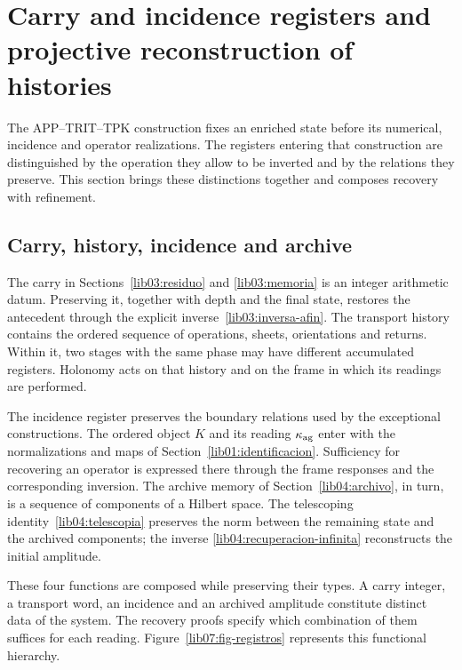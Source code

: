 \section{Carry and incidence registers and projective reconstruction of histories}
\label{lib07:armonizacion}
The APP--TRIT--TPK construction fixes an enriched state before
its numerical, incidence and operator realizations. The registers
entering that construction are distinguished by the operation
they allow to be inverted and by the relations they preserve. This section
brings these distinctions together and composes recovery with refinement.

\subsection{Carry, history, incidence and archive}
The carry in Sections~\ref{lib03:residuo} and
\ref{lib03:memoria} is an integer arithmetic datum. Preserving it,
together with depth and the final state, restores the antecedent
through the explicit inverse~\eqref{lib03:inversa-afin}.
The transport history contains the ordered sequence of operations,
sheets, orientations and returns. Within it, two stages with the same phase
may have different accumulated registers. Holonomy acts on
that history and on the frame in which its readings are performed.

The incidence register preserves the boundary relations
used by the exceptional constructions. The ordered object \(K\)
and its reading \(\kappa_{\rm ag}\) enter with the normalizations
and maps of Section~\ref{lib01:identificacion}.
Sufficiency for recovering an operator is expressed there through
the frame responses and the corresponding inversion.
The archive memory of Section~\ref{lib04:archivo}, in turn,
is a sequence of components of a Hilbert space. The telescoping
identity~\eqref{lib04:telescopia} preserves the norm between the
remaining state and the archived components; the inverse
\eqref{lib04:recuperacion-infinita} reconstructs the initial amplitude.

These four functions are composed while preserving their types.
A carry integer, a transport word, an incidence
and an archived amplitude constitute distinct data of the system.
The recovery proofs specify which combination of them
suffices for each reading. Figure~\ref{lib07:fig-registros}
represents this functional hierarchy.

